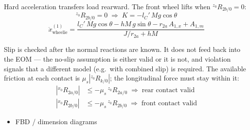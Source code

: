 \begin{aiblock}
Hard acceleration transfers load rearward. The front wheel lifts when ${}^{z_0}R_{2b/0} = 0$:
\begin{equation}
    {}^{z_0}R_{2b/0} = 0 \;\Rightarrow\; K = -l_C'\,Mg\cos\theta
\end{equation}
\begin{equation}
    \ddot{x}^{(1)}_{\text{wheelie}} = \frac{l_C'\,Mg\cos\theta - hM\,g\sin\theta - r_{2a}\,A_{1,x} + A_{1,m}}{J/r_{2a} + hM}
\end{equation}

Slip is checked after the normal reactions are known. It does not feed back into the EOM --- the no-slip assumption is either valid or it is not, and violation signals that a different model (e.g.\ with combined slip) is required. The available friction at each contact is $\mu_s\left|{}^{z_0}R_{k/0}\right|$; the longitudinal force must stay within it:
\begin{align}
    \left|{}^{x_0}R_{2a/0}\right| &\le -\mu_s\,{}^{z_0}R_{2a/0} \;\Rightarrow\; \text{rear contact valid} \\
    \left|{}^{x_0}R_{2b/0}\right| &\le -\mu_s\,{}^{z_0}R_{2b/0} \;\Rightarrow\; \text{front contact valid}
\end{align}

\begin{itemize}
    \item FBD / dimension diagrams
\end{itemize}
\end{aiblock}
